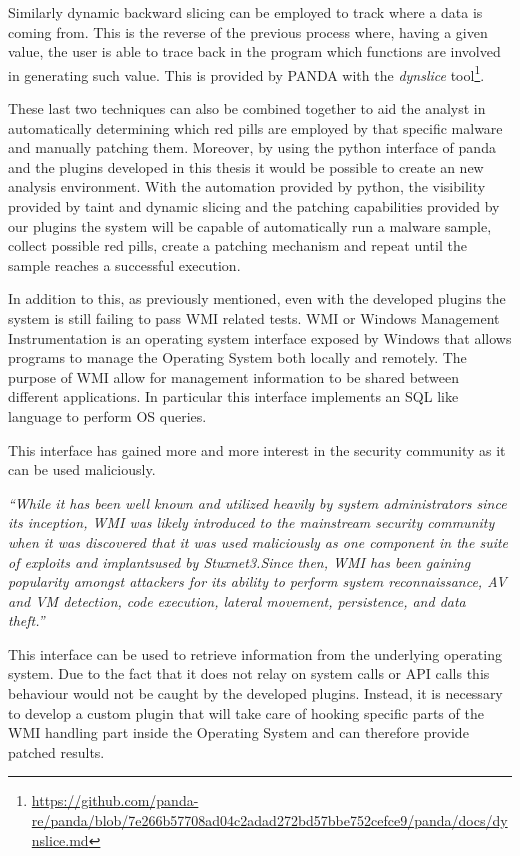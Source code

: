 Similarly dynamic backward slicing can be employed to track where a data is coming from. This is the reverse of the previous process where, having a given value, the user is able to trace back in the program which functions are involved in generating such value. This is provided by PANDA with the \textit{dynslice} tool\footnote{\url{https://github.com/panda-re/panda/blob/7e266b57708ad04c2adad272bd57bbe752cefce9/panda/docs/dynslice.md}}.

These last two techniques can also be combined together to aid the analyst in automatically determining which red pills are employed by that specific malware and manually patching them. Moreover, by using the python interface of panda and the plugins developed in this thesis it would be possible to create an new analysis environment. With the automation provided by python, the visibility provided by taint and dynamic slicing and the patching capabilities provided by our plugins the system will be capable of automatically run a malware sample, collect possible red pills, create a patching mechanism and repeat until the sample reaches a successful execution.  

In addition to this, as previously mentioned, even with the developed plugins the system is still failing to pass WMI related tests. WMI or Windows Management Instrumentation is an operating system interface exposed by Windows that allows programs to manage the Operating System both locally and remotely. The purpose of WMI allow for management information to be shared between different applications. In particular this interface implements an SQL like language to perform OS queries.

This interface has gained more and more interest in the security community as it can be used maliciously. 

\textit{``While it has been well known and utilized heavily by system administrators since its inception, WMI was likely introduced to the mainstream security community when it was discovered that it was used maliciously as one component in the suite of exploits and implantsused by Stuxnet3.Since then, WMI has been gaining popularity amongst attackers for its ability to perform system reconnaissance, AV and VM detection, code execution, lateral movement, persistence, and data theft.''}~\cite{wmi}


This interface can be used to retrieve information from the underlying operating system. Due to the fact that it does not relay on system calls or API calls this behaviour would not be caught by the developed plugins. Instead, it is necessary to develop a custom plugin that will take care of hooking specific parts of the WMI handling part inside the Operating System and can therefore provide patched results. 

